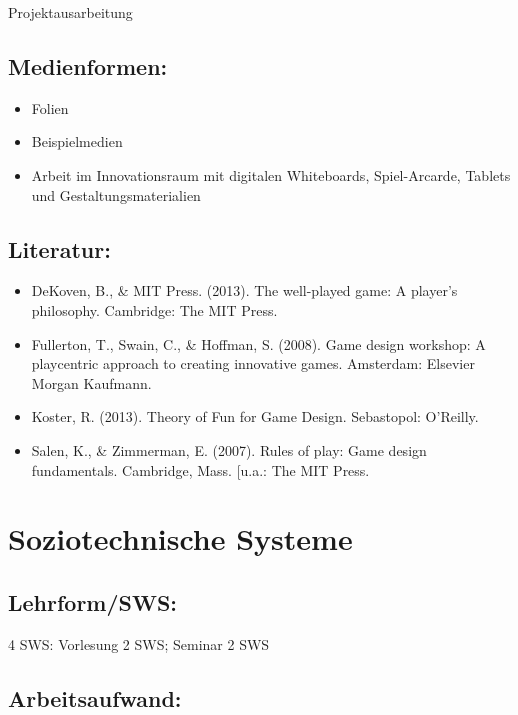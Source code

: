 Projektausarbeitung

\section{Medienformen:}\label{medienformen-23}

\begin{itemize}
\tightlist
\item
  Folien
\item
  Beispielmedien
\item
  Arbeit im Innovationsraum mit digitalen Whiteboards, Spiel-Arcarde,
  Tablets und Gestaltungsmaterialien
\end{itemize}

\section{Literatur:}\label{literatur-23}

\begin{itemize}
\tightlist
\item
  DeKoven, B., \& MIT Press. (2013). The well-played game: A player's
  philosophy. Cambridge: The MIT Press.
\item
  Fullerton, T., Swain, C., \& Hoffman, S. (2008). Game design workshop:
  A playcentric approach to creating innovative games. Amsterdam:
  Elsevier Morgan Kaufmann.
\item
  Koster, R. (2013). Theory of Fun for Game Design. Sebastopol:
  O'Reilly.
\item
  Salen, K., \& Zimmerman, E. (2007). Rules of play: Game design
  fundamentals. Cambridge, Mass. {[}u.a.: The MIT Press.
\end{itemize}

\chapter{Soziotechnische Systeme}\label{soziotechnische-systeme}

\section{Lehrform/SWS:}\label{lehrformsws-24}

4 SWS: Vorlesung 2 SWS; Seminar 2 SWS

\section{Arbeitsaufwand:}\label{arbeitsaufwand-23}


